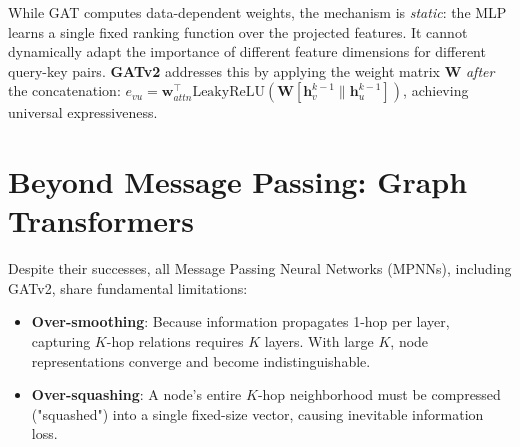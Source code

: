 \begin{insightbox}
While GAT computes data-dependent weights, the mechanism is \textit{static}: the MLP learns a single fixed ranking function over the projected features. It cannot dynamically adapt the importance of different feature dimensions for different query-key pairs. \textbf{GATv2} addresses this by applying the weight matrix $\mathbf{W}$ \textit{after} the concatenation: $e_{vu} = \mathbf{w}_{attn}^\top \text{LeakyReLU} \left( \mathbf{W} [\mathbf{h}_v^{k-1} \| \mathbf{h}_u^{k-1}] \right)$, achieving universal expressiveness.
\end{insightbox}

\section{Beyond Message Passing: Graph Transformers}
Despite their successes, all Message Passing Neural Networks (MPNNs), including GATv2, share fundamental limitations:
\begin{itemize}
    \item \textbf{Over-smoothing}: Because information propagates 1-hop per layer, capturing $K$-hop relations requires $K$ layers. With large $K$, node representations converge and become indistinguishable.
    \item \textbf{Over-squashing}: A node's entire $K$-hop neighborhood must be compressed ("squashed") into a single fixed-size vector, causing inevitable information loss.
\end{itemize}

